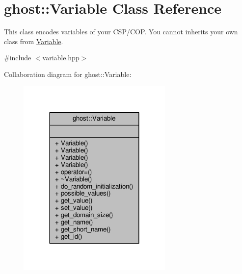 \hypertarget{classghost_1_1Variable}{}\section{ghost\+:\+:Variable Class Reference}
\label{classghost_1_1Variable}


This class encodes variables of your C\+S\+P/\+C\+OP. You cannot inherits your own class from \hyperlink{classghost_1_1Variable}{Variable}.  




{\ttfamily \#include $<$variable.\+hpp$>$}



Collaboration diagram for ghost\+:\+:Variable\+:
\nopagebreak
\begin{figure}[H]
\begin{center}
\leavevmode
\includegraphics[width=216pt]{classghost_1_1Variable__coll__graph}
\end{center}
\end{figure}
